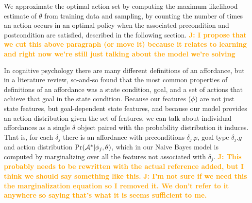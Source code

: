 \documentclass[conference]{IEEEtran}
\newcommand{\jnote}[1]{\textcolor{Orange}{\textbf{J: #1}}}
\begin{document}
We approximate the optimal action set by computing the maximum
likelihood estimate of $\theta$ from training data and sampling, by
counting the number of times an action occurs in an optimal policy
when the associated precondition and postcondition are satisfied,
described in the following section.
\jnote{I propose that we cut this above paragraph (or move it) because it relates to learning and right now we're still just talking about the model we're solving}

In cognitive psychology there are many different definitions of an affordance,
but in a literature review, so-and-so found that the most common properties of definitions of an affordance was a state condition, goal, and a set of actions that achieve that goal in the state condition. Because our features ($\phi$) are not just state features, but goal-dependent state features, and because our model provides an action distribution given the set of features, we can talk about individual affordances as a single $\delta$ object paired with the probability distribution it induces. That is, for each $\delta_j$ there is an affordance with preconditions $\delta_j.p$, goal type $\delta_j.g$ and action distribution $\Pr({\cal A}^* | \phi_j, \theta)$, which in our Naive Bayes model is computed by marginalizing over all the features not associated with $\delta_j$.
\jnote{This probably needs to be rewritten with the actual reference added, but  I think we should say something like this.}
\jnote{I'm not sure if we need this the marginalization equation so I removed it. We don't refer to it anywhere so saying that's what it is seems sufficient to me.}
\end{document}
